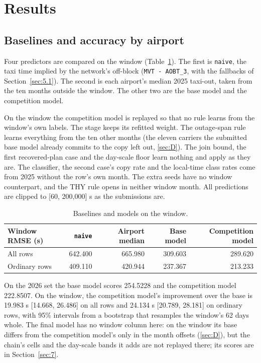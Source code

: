 \documentclass[
  manuscript=article,
  layout=preprint,
  year=2026,
  volume=x,
]{extra/joas}
\begin{document}
\section{Results}\label{sec:6}

\subsection{Baselines and accuracy by airport}\label{sec:6.1}

Four predictors are compared on the window (Table~\ref{tab:12}). The first is \texttt{naive}, the taxi time implied by the network's off-block (\texttt{MVT\ -\ AOBT\_3}, with the fallbacks of Section~\ref{sec:5.1}). The second is each airport's median 2025 taxi-out, taken from the ten months outside the window. The other two are the base model and the competition model.

On the window the competition model is replayed so that no rule learns from the window's own labels. The stage keeps its refitted weight. The outage-span rule learns everything from the ten other months (the eleven carriers the submitted base model already commits to the copy left out, \ref{sec:D}). The join bound, the first recovered-plan case and the day-scale floor learn nothing and apply as they are. The classifier, the second case's copy rate and the local-time class rates come from 2025 without the row's own month. The extra seeds have no window counterpart, and the THY rule opens in neither window month. All predictions are clipped to {[}60, 200,000{]} s as the submissions are.

\begin{table}[htbp!]
  \centering
  \small
  \setlength{\tabcolsep}{5pt}\renewcommand{\arraystretch}{1.15}
  \caption{Baselines and models on the window.}
  \label{tab:12}
  \begin{tabular*}{\linewidth}{@{\extracolsep{\fill}}lrrrr}
  \toprule
  \textbf{Window RMSE (s)} & \textbf{\texttt{naive}} & \textbf{Airport median} & \textbf{Base model} & \textbf{Competition model} \\
  \midrule
  All rows & 642.400 & 665.980 & 309.603 & 289.620 \\
  Ordinary rows & 409.110 & 420.944 & 237.367 & 213.233 \\
  \bottomrule
  \end{tabular*}
\end{table}

On the 2026 set the base model scores 254.5228 and the competition model 222.8507. On the window, the competition model's improvement over the base is 19.983 s {[}14.668, 26.486{]} on all rows and 24.134 s {[}20.789, 28.181{]} on ordinary rows, with 95\% intervals from a bootstrap that resamples the window's 62 days whole. The final model has no window column here: on the window its base differs from the competition model's only in the month offsets (\ref{sec:D}), but the chain's cells and the day-scale bands it adds are not replayed there; its scores are in Section~\ref{sec:7}.
\end{document}
